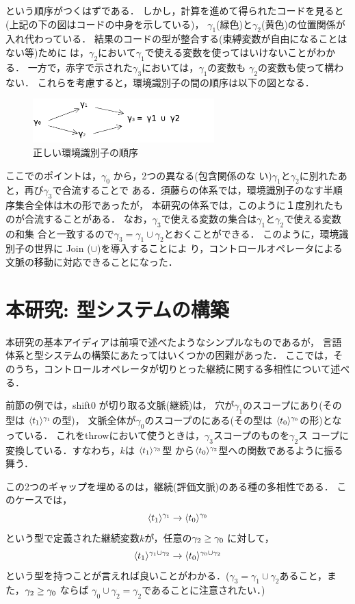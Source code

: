 という順序がつくはずである．
しかし，計算を進めて得られたコードを見ると(上記の下の図はコードの中身を示している)，
$\gamma_1$(緑色)と$\gamma_2$(黄色)の位置関係が入れ代わっている．
結果のコードの型が整合する(束縛変数が自由になることはない等)ために
は，$\gamma_2$において$\gamma_1$で使える変数を使ってはいけないことがわかる．
一方で，赤字で示された$\gamma_3$においては，$\gamma_1$の変数も
$\gamma_2$の変数も使って構わない．
これらを考慮すると，環境識別子の間の順序は以下の図となる．

\begin{figure}[ht]
  \centering
  \includegraphics[clip,width=7cm]{./img/gamma.png}
  \caption{正しい環境識別子の順序}
  \label{fig:gamma}
\end{figure}

ここでのポイントは，$\gamma_0$ から，2つの異なる(包含関係のな
い)$\gamma_1$と$\gamma_2$に別れたあと，再び$\gamma_3$で合流することで
ある．須藤らの体系では，環境識別子のなす半順序集合全体は木の形であったが，
本研究の体系では，このように１度別れたものが合流することがある．
なお，$\gamma_3$で使える変数の集合は$\gamma_1$と$\gamma_2$で使える変数の和集
合と一致するので$\gamma_3 = \gamma_1 \cup \gamma_2$とおくことができる．
このように，環境識別子の世界に Join ($\cup$)を導入することによ
り，コントロールオペレータによる文脈の移動に対応できることになった．

\section{本研究: 型システムの構築}

本研究の基本アイディアは前項で述べたようなシンプルなものであるが，
言語体系と型システムの構築にあたってはいくつかの困難があった．
ここでは，そのうち，コントロールオペレータが切りとった継続に関する多相性について述べる．

前節の例では，shift0 が切り取る文脈(継続)は，
穴が$\gamma_1$のスコープにあり(その型は $\langle{t_1}\rangle^{\gamma_1}$の型)，
文脈全体が$\gamma_0$のスコープのにある(その型は
$\langle{t_0}\rangle^{\gamma_0}$の形)となっている．
これをthrowにおいて使うときは，$\gamma_3$スコープのものを$\gamma_2$ス
コープに変換している．すなわち，$k$は $\langle{t_1}\rangle^{\gamma_3}$型
から$\langle{t_0}\rangle^{\gamma_2}$型への関数であるように振る舞う．

この2つのギャップを埋めるのは，継続(評価文脈)のある種の多相性である．
このケースでは，
\[\langle{t_1}\rangle^{\gamma_1} \to \langle{t_0}\rangle^{\gamma_0} \]
という型で定義された継続変数$k$が，任意の$\gamma_2 \ge \gamma_0$ に対して，
\[\langle{t_1}\rangle^{\gamma_1 \cup \gamma_2} \to \langle{t_0}\rangle^{\gamma_0 \cup \gamma_2} \]
という型を持つことが言えれば良いことがわかる．($\gamma_3 = \gamma_1
\cup \gamma_2$あること，また，$\gamma_2 \ge \gamma_0$ ならば
$\gamma_0 \cup \gamma_2 = \gamma_2$であることに注意されたい．)

